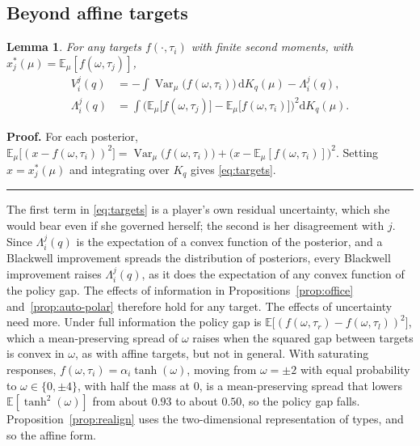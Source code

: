 \documentclass[12pt,letterpaper]{article}
\newtheorem{lemma}{Lemma}
\newenvironment{proof}[1][Proof]{\noindent\textbf{#1.} }{\ \rule{0.5em}{0.5em}}
\begin{document}
\subsection*{Beyond affine targets}

\begin{lemma}\label{lem:targets}
For any targets $f(\cdot,\tau_i)$ with finite second moments, with $x^*_j(\mu)=\mathbb{E}_\mu[f(\omega,\tau_j)]$,
\begin{align}
V_i^j(q)&=-\int\operatorname{Var}_\mu\big(f(\omega,\tau_i)\big)\,\mathrm{d}K_q(\mu)-\Lambda_i^j(q),\label{eq:targets}\\
\Lambda_i^j(q)&=\int\Big(\mathbb{E}_\mu\big[f(\omega,\tau_j)\big]-\mathbb{E}_\mu\big[f(\omega,\tau_i)\big]\Big)^2\mathrm{d}K_q(\mu).\nonumber
\end{align}
\end{lemma}

\begin{proof}
For each posterior, $\mathbb{E}_\mu\big[(x-f(\omega,\tau_i))^2\big]=\operatorname{Var}_\mu\big(f(\omega,\tau_i)\big)+\big(x-\mathbb{E}_\mu[f(\omega,\tau_i)]\big)^2$. Setting $x=x^*_j(\mu)$ and integrating over $K_q$ gives \eqref{eq:targets}.
\end{proof}

The first term in \eqref{eq:targets} is a player's own residual uncertainty, which she would bear even if she governed herself; the second is her disagreement with $j$. Since $\Lambda_i^j(q)$ is the expectation of a convex function of the posterior, and a Blackwell improvement spreads the distribution of posteriors, every Blackwell improvement raises $\Lambda_i^j(q)$, as it does the expectation of any convex function of the policy gap. The effects of information in Propositions~\ref{prop:office} and~\ref{prop:auto-polar} therefore hold for any target. The effects of uncertainty need more. Under full information the policy gap is $\mathbb{E}\big[(f(\omega,\tau_r)-f(\omega,\tau_l))^2\big]$, which a mean-preserving spread of $\omega$ raises when the squared gap between targets is convex in $\omega$, as with affine targets, but not in general. With saturating responses, $f(\omega,\tau_i)=\alpha_i\tanh(\omega)$, moving from $\omega=\pm2$ with equal probability to $\omega\in\{0,\pm4\}$, with half the mass at $0$, is a mean-preserving spread that lowers $\mathbb{E}[\tanh^2(\omega)]$ from about $0.93$ to about $0.50$, so the policy gap falls. Proposition~\ref{prop:realign} uses the two-dimensional representation of types, and so the affine form.
\end{document}
